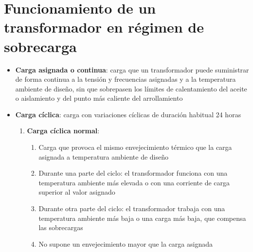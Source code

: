 \section{Funcionamiento de un transformador en régimen de sobrecarga}
\begin{itemize}
	\item \textbf{Carga asignada o continua}: carga que un transformador puede suministrar de forma continua a la tensión y frecuencias asignadas y a la temperatura ambiente de diseño, sin que sobrepasen los límites de calentamiento del aceite o aislamiento y del punto más caliente del arrollamiento
	\item \textbf{Carga cíclica}: carga con variaciones cíclicas de duración habitual 24 horas
	\begin{enumerate}
		\item \textbf{Carga cíclica normal}:
		\begin{enumerate}
			\item Carga que provoca el mismo envejecimiento térmico que la carga asignada a temperatura ambiente de diseño
			\item Durante una parte del ciclo: el transformador funciona con una temperatura ambiente más elevada o con una corriente de carga superior al valor asignado
			\item Durante otra parte del ciclo: el transformador trabaja con una temperatura ambiente más baja o una carga más baja, que compensa las sobrecargas
			\item No supone un envejecimiento mayor que la carga asignada
			

\end{enumerate}
\end{enumerate}
\end{itemize}
